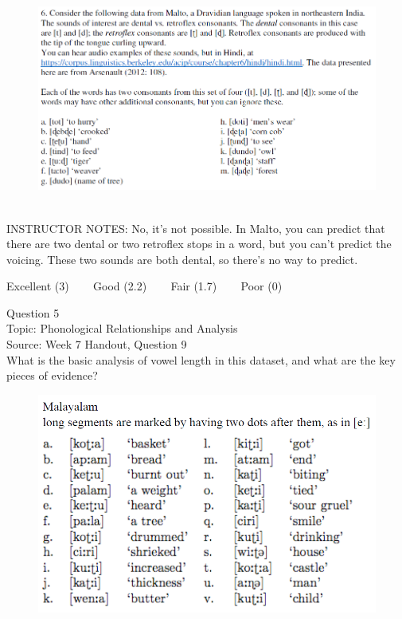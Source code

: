 \documentclass[12pt]{article}
\begin{document}
\begin{figure}[H]
\includegraphics{../images/malto.png}
\end{figure}

~\\
INSTRUCTOR NOTES: No, it's not possible. In Malto, you can predict that there are two dental or two retroflex stops in a word, but you can't predict the voicing. These two sounds are both dental, so there's no way to predict.


\vfill
Excellent (3) ~~~ Good (2.2) ~~~ Fair (1.7) ~~~ Poor (0)
\newpage

{\large Question 5}\\

Topic: Phonological Relationships and Analysis\\
Source: Week 7 Handout, Question 9\\

What is the basic analysis of vowel length in this dataset, and what are the key pieces of evidence?\\

\begin{figure}[H]
\includegraphics{../images/malayalam.png}
\end{figure}
\end{document}
